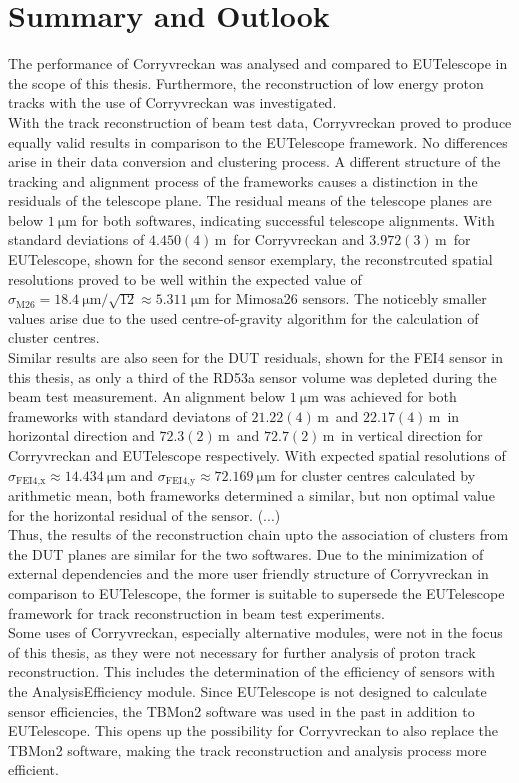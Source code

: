 \chapter{Summary and Outlook}
The performance of Corryvreckan was analysed and compared to EUTelescope in the scope of this thesis. Furthermore, the reconstruction of low energy proton
tracks with the use of Corryvreckan was investigated.\\
With the track reconstruction of beam test data, Corryvreckan proved to produce equally valid results in comparison to the EUTelescope framework. No differences
arise in their data conversion and clustering process. A different structure of the tracking and alignment process of the frameworks causes a distinction in the residuals
of the telescope plane. The residual means of the telescope planes are below $\SI{1}{\micro\meter}$ for both softwares, indicating successful telescope alignments.
With standard deviations of $4.450(4)$\,\textmu m\, for Corryvreckan and $3.972(3)$\,\textmu m\, for EUTelescope, shown for the second sensor exemplary, the
reconstrcuted spatial resolutions proved to be well within
the expected value of $\sigma_{\text{M26}} = \SI{18.4}{\micro\meter}/\sqrt{12} \approx \SI{5.311}{\micro\meter}$ for Mimosa26 sensors. The noticebly smaller values
arise due to the used centre-of-gravity algorithm for the calculation of cluster centres. \\
Similar results are also seen for the DUT residuals, shown for the FEI4 sensor in this thesis, as only a third of the RD53a sensor volume was depleted during the beam test measurement.
An alignment below $\SI{1}{\micro\meter}$ was achieved for both frameworks with standard deviatons of $21.22(4)$\,\textmu m\, and $22.17(4)$\,\textmu m\, in horizontal direction and
$72.3(2)$\,\textmu m\, and $72.7(2)$\,\textmu m\, in vertical direction for Corryvreckan and EUTelescope respectively. With expected spatial resolutions of
$\sigma_{\text{FEI4},\text{x}} \approx \SI{14.434}{\micro\meter}$ and $\sigma_{\text{FEI4},\text{y}} \approx \SI{72.169}{\micro\meter}$ for cluster centres calculated by
arithmetic mean, both frameworks determined a similar, but non optimal value for the horizontal residual of the sensor. (...) \\
Thus, the results of the reconstruction chain upto the
association of clusters from the DUT planes are similar for the two softwares. Due to the minimization of external dependencies and the more user friendly structure of
Corryvreckan in comparison to EUTelescope, the former is suitable to supersede the EUTelescope framework for track reconstruction in beam test experiments. \\
Some uses of Corryvreckan, especially alternative modules, were not in the focus of this thesis,
as they were not necessary for further analysis of proton track reconstruction. This includes the determination of the
efficiency of sensors with the AnalysisEfficiency module. Since EUTelescope is not designed to calculate sensor efficiencies, the TBMon2 software was used in the past in addition
to EUTelescope. This opens up the possibility for Corryvreckan to also replace the TBMon2 software, making the track reconstruction and analysis process more efficient.

